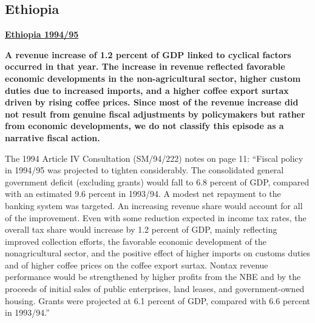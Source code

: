 \subsection[Ethiopia]{Ethiopia\protect\footnotemark}

\textbf{\underline{Ethiopia 1994/95}}

\textbf{A revenue increase of 1.2 percent of GDP linked to cyclical factors occurred in that year. The increase in revenue reflected favorable economic developments in the non-agricultural sector, higher custom duties due to increased imports, and a higher coffee export surtax driven by rising coffee prices. Since most of the revenue increase did not result from genuine fiscal adjustments by policymakers but rather from economic developments, we do not classify this episode as a narrative fiscal action.} 

The 1994 Article IV Consultation (SM/94/222) notes on page 11: “Fiscal policy in 1994/95 was projected to tighten considerably. The consolidated general government deficit (excluding grants) would fall to 6.8 percent of GDP, compared with an estimated 9.6 percent in 1993/94. A modest net repayment to the banking system was targeted. An increasing revenue share would account for all of the improvement. Even with some reduction expected in income tax rates, the overall tax share would increase by 1.2 percent of GDP, mainly reflecting improved collection efforts, the favorable economic development of the nonagricultural sector, and the positive effect of higher imports on customs duties and of higher coffee prices on the coffee export surtax. Nontax revenue performance would be strengthened by higher profits from the NBE and by the proceeds of initial sales of public enterprises, land leases, and government-owned housing. Grants were projected at 6.1 percent of GDP, compared with 6.6 percent in 1993/94.”

